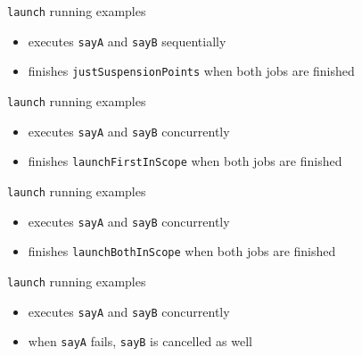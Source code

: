 \documentclass[hyperref={pdfpagelabels=false},xcolor={dvipsnames},compress,onlytextwidth]{beamer}
\begin{document}
    \begin{frame}[fragile]{\texttt{launch} running examples}
        \pause
        \begin{itemize}
            \item executes \texttt{sayA} and \texttt{sayB} sequentially\pause
            \item finishes \texttt{justSuspensionPoints} when both jobs are finished
        \end{itemize}
    \end{frame}

    \begin{frame}[fragile]{\texttt{launch} running examples}
        \pause
        \begin{itemize}
            \item executes \texttt{sayA} and \texttt{sayB} concurrently\pause
            \item finishes \texttt{launchFirstInScope} when both jobs are finished
        \end{itemize}
    \end{frame}

    \begin{frame}[fragile]{\texttt{launch} running examples}
        \pause
        \begin{itemize}
            \item executes \texttt{sayA} and \texttt{sayB} concurrently\pause
            \item finishes \texttt{launchBothInScope} when both jobs are finished
        \end{itemize}
    \end{frame}

    \begin{frame}[fragile]{\texttt{launch} running examples}
        \pause
        \begin{itemize}
            \item executes \texttt{sayA} and \texttt{sayB} concurrently\pause
            \item when \texttt{sayA} fails, \texttt{sayB} is cancelled as well
        \end{itemize}
    \end{frame}
\end{document}
